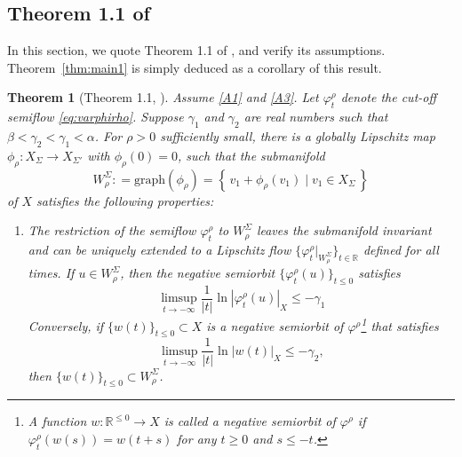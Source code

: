 \documentclass[a4paper, 12pt, oneside, reqno, notitlepage]{amsart}
\theoremstyle{plain}
\newtheorem{theorem}{Theorem}
\theoremstyle{definition}
\theoremstyle{remark}
\newcommand{\gr}{\mathrm{graph}}
\begin{document}
\subsection{Theorem 1.1 of \texorpdfstring{\cite{chen1997invariant}}{[CHT97]}}
\label{sect:CHT}

In this section, we quote Theorem 1.1 of \cite{chen1997invariant}, and verify its assumptions.
Theorem~\ref{thm:main1} is simply deduced as a corollary of this result.



\begin{theorem}[Theorem 1.1, \cite{chen1997invariant}]
\label{thm:CHT}
Assume \ref{A1} and \ref{A3}.
Let $\varphi_t^\rho$ denote the cut-off semiflow \eqref{eq:varphirho}.
Suppose $\gamma_1$ and $\gamma_2$ are real numbers such that $\beta < \gamma_2 < \gamma_1 < \alpha$.
For $\rho>0$ sufficiently small, there is a globally Lipschitz 
map 
$\phi_\rho : X_\Sigma \to X_{\Sigma'}$ with $\phi_\rho(0) = 0$, such that the submanifold 
\begin{equation}
W^{\Sigma}_\rho : = \gr ( \phi_\rho) = \left\{ \, v_1 + \phi_\rho(v_1) \; \vert \; v_1 \in X_\Sigma  \, \right\}
\label{eq:Wsigmarho}
\end{equation}
of $X$ satisfies the following properties:
\begin{enumerate}[label=\upshape{(\roman*)}]
  \item \label{item1:CHT} The restriction of the semiflow $\varphi_t^\rho$ to $W^{\Sigma}_\rho$ leaves the submanifold invariant and can be uniquely extended to a Lipschitz flow $\{\varphi_t^\rho \vert_{W^{\Sigma}_\rho} \}_{t \in \mathbb{R}}$ defined for all times.
  If $u \in W^{\Sigma}_\rho$, then the negative semiorbit $\{ \varphi_t^\rho(u) \}_{t \leq 0}$ satisfies
  \begin{equation}
      \limsup_{t \to -\infty} \frac{1}{|t|} \ln |\varphi_t^\rho(u)|_X \leq -  \gamma_1
      \label{eq:negative_semiorbit_1}
  \end{equation}
  Conversely, if $\{w(t)\}_{t \leq 0} \subset X$ is a negative semiorbit of $\varphi^\rho$\footnote{A function $w : \mathbb{R}^{\leq 0} \to X$ is called a negative semiorbit of $\varphi^\rho$ if $\varphi_t^\rho(w(s)) = w(t+s)$ for any $t \geq 0$ and $s \leq -t$.} that satisfies
  \begin{equation}
      \limsup_{t \to -\infty} \frac{1}{|t|} \ln |w(t)|_X \leq -  \gamma_2,
      \label{eq:negative_semiorbit_2}
  \end{equation}
  then $\{w(t)\}_{t \leq 0} \subset W^\Sigma_\rho$.
  

\end{enumerate}
\end{theorem}
\end{document}
